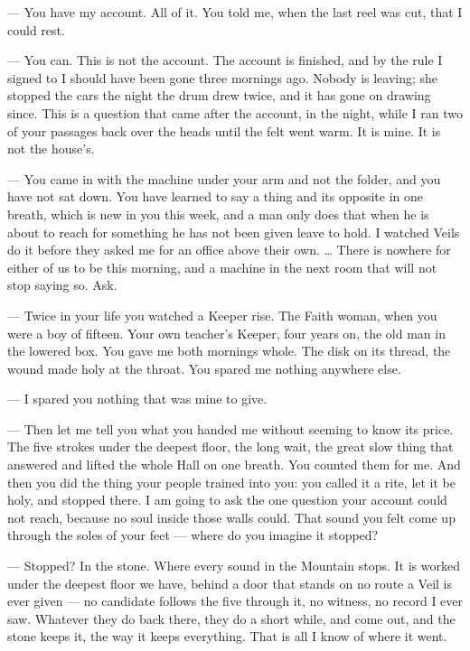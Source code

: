 
\begin{room}

--- You have my account. All of it. You told me, when the last reel was cut, that I could rest.

--- You can. This is not the account. The account is finished, and by the rule I signed to I should have been gone three mornings ago. Nobody is leaving; she stopped the cars the night the drum drew twice, and it has gone on drawing since. This is a question that came after the account, in the night, while I ran two of your passages back over the heads until the felt went warm. It is mine. It is not the house's.

--- You came in with the machine under your arm and not the folder, and you have not sat down. You have learned to say a thing and its opposite in one breath, which is new in you this week, and a man only does that when he is about to reach for something he has not been given leave to hold. I watched Veils do it before they asked me for an office above their own. \ldots{} There is nowhere for either of us to be this morning, and a machine in the next room that will not stop saying so. Ask.

--- Twice in your life you watched a Keeper rise. The Faith woman, when you were a boy of fifteen. Your own teacher's Keeper, four years on, the old man in the lowered box. You gave me both mornings whole. The disk on its thread, the wound made holy at the throat. You spared me nothing anywhere else.

--- I spared you nothing that was mine to give.

--- Then let me tell you what you handed me without seeming to know its price. The five strokes under the deepest floor, the long wait, the great slow thing that answered and lifted the whole Hall on one breath. You counted them for me. And then you did the thing your people trained into you: you called it a rite, let it be holy, and stopped there. I am going to ask the one question your account could not reach, because no soul inside those walls could. That sound you felt come up through the soles of your feet --- where do you imagine it stopped?

--- Stopped? In the stone. Where every sound in the Mountain stops. It is worked under the deepest floor we have, behind a door that stands on no route a Veil is ever given --- no candidate follows the five through it, no witness, no record I ever saw. Whatever they do back there, they do a short while, and come out, and the stone keeps it, the way it keeps everything. That is all I know of where it went.


\end{room}
